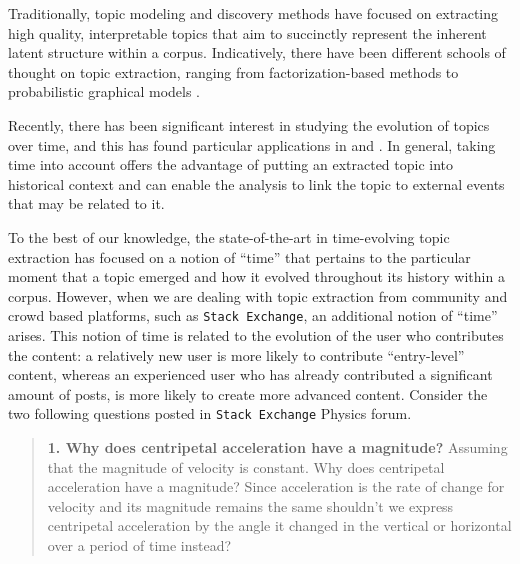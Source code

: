 Traditionally, topic modeling and discovery methods have focused on extracting high quality, interpretable topics that aim to succinctly represent the inherent latent structure within a corpus. Indicatively, there have been different schools of thought on topic extraction, ranging from factorization-based methods \cite{deerwester1990indexing, xu2003document}  to probabilistic graphical models \cite{blei2003latent,steyvers2004probabilistic}.

Recently, there has been significant interest in studying the evolution of topics over time, and this has found particular applications in \cite{wiredmovie} and \cite{he2009detecting}. In general, taking time into account offers the advantage of putting an extracted topic into historical context and can enable the analysis to link the topic to external events that may be related to it.

To the best of our knowledge, the state-of-the-art in time-evolving topic extraction has focused on a notion of ``time'' that pertains to the particular moment that a topic emerged and how it evolved throughout its history within a corpus. However, when we are dealing with topic extraction from community and crowd based platforms, such as \texttt{Stack Exchange}, an additional notion of ``time'' arises. This notion of time is related to the evolution of the user who contributes the content: a relatively new user is more likely to contribute ``entry-level'' content, whereas an experienced user who has already contributed a significant amount of posts, is more likely to create more advanced content. 
Consider the two following questions posted in \texttt{Stack Exchange} Physics forum. 

\begin{quote}
\textbf{1. Why does centripetal acceleration have a magnitude?}
Assuming that the magnitude of velocity is constant. Why does centripetal acceleration have a magnitude? Since acceleration is the rate of change for velocity and its magnitude remains the same shouldn't we express centripetal acceleration by the angle it changed in the vertical or horizontal over a period of time instead?
\end{quote}

